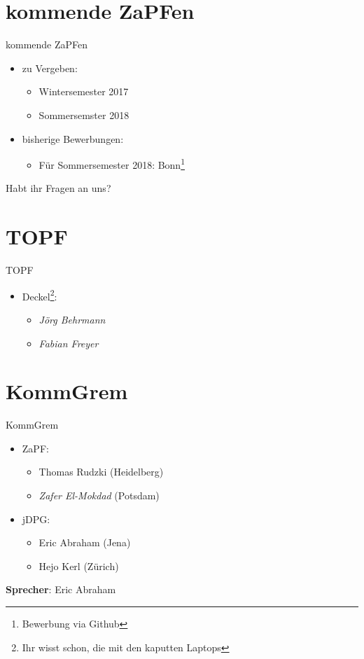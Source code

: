 \documentclass[compress,]{beamer}
\begin{document}
\section{kommende ZaPFen}
\begin{frame}{kommende ZaPFen}
	\begin{itemize}
		\item zu Vergeben:
			\begin{itemize}
				\item Wintersemester 2017
				\item Sommersemster 2018
			\end{itemize}
		\item bisherige Bewerbungen:
			\begin{itemize}
				\item Für Sommersemester 2018: Bonn\footnote{Bewerbung via Github}
			\end{itemize}
	\end{itemize}
\end{frame}

\begin{frame}[plain]
	\begin{center}
		\Huge Habt ihr Fragen an uns?
	\end{center}
\end{frame}

\section{TOPF}
\begin{frame}{TOPF}
	\begin{itemize}
		\item[] Deckel\footnote{Ihr wisst schon, die mit den kaputten Laptops}:
			\begin{itemize}
				\item \emph{Jörg Behrmann}
				\item \emph{Fabian Freyer}
			\end{itemize}
	\end{itemize}
\end{frame}

\section{KommGrem}

\begin{frame}{KommGrem}
	\begin{itemize}
		\item[] ZaPF:
			\begin{itemize}
				\item Thomas Rudzki (Heidelberg)
				\item \emph{Zafer El-Mokdad} (Potsdam)
			\end{itemize}
		\item[] jDPG:
			\begin{itemize}
				\item Eric Abraham (Jena)
				\item Hejo Kerl (Zürich)
			\end{itemize}
	\end{itemize}
	\vspace{0.5cm}
	\textbf{Sprecher}: Eric Abraham
\end{frame}
\end{document}
